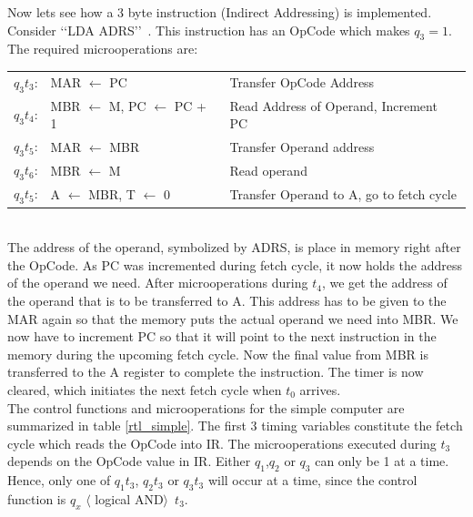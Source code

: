 \documentclass{book}
\begin{document}
Now lets see how a 3 byte instruction (Indirect Addressing) is implemented. Consider \lq\lq LDA ADRS\rq\rq\ . This instruction has an OpCode which makes $q_3 = 1$. The required microoperations are:\\[.5cm]
\begin{tabular}{r l l}
$q_3t_3$: & MAR $\leftarrow$ PC & Transfer OpCode Address \\
$q_3t_4$: & MBR $\leftarrow$ M, PC $\leftarrow$ PC + 1 & Read Address of Operand, Increment PC\\
$q_3t_5$: & MAR $\leftarrow$ MBR & Transfer Operand address\\
$q_3t_6$: & MBR $\leftarrow$ M & Read operand\\
$q_3t_5$: & A $\leftarrow$ MBR, T $\leftarrow$ 0 & Transfer Operand to A, go to fetch cycle\\
\end{tabular}
\\[.4cm]
The address of the operand, symbolized by ADRS, is place in memory right after the OpCode. As PC was incremented during fetch cycle, it now holds the address of the operand we need. After microoperations during $t_4$, we get the address of the operand that is to be transferred to A. This address has to be given to the MAR again so that the memory puts the actual operand we need into MBR. We now have to increment PC so that it will point to the next instruction in the memory during the upcoming fetch cycle. Now the final value from MBR is transferred to the A register to complete the instruction. The timer is now cleared, which initiates the next fetch cycle when $t_0$ arrives.\\


The control functions and microoperations for the simple computer are summarized in table \ref{rtl_simple}. The first 3 timing variables constitute the fetch cycle which reads the OpCode into IR. The microoperations executed during $t_3$ depends on the OpCode value in IR. Either $q_1$,$q_2$ or $q_3$ can only be 1 at a time. Hence, only one of $q_1t_3$, $q_2t_3$ or $q_3t_3$ will occur at a time, since the control function is $q_x$ $\langle$ logical AND$\rangle$\ $t_3$.
\end{document}
